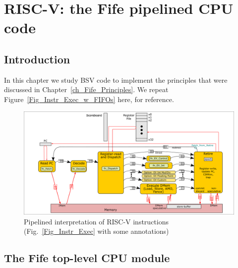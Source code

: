 

\chapter{RISC-V: the Fife pipelined CPU code}


\setcounter{page}{1}
\renewcommand{\thepage}{\arabic{chapter}-\arabic{page}}

\label{ch_Fife_code}


\section{Introduction}

In this chapter we study BSV code to implement the principles that
were discussed in Chapter~\ref{ch_Fife_Principles}.
We repeat Figure~\ref{Fig_Instr_Exec_w_FIFOs} here, for reference.
\begin{figure}[htbp]
  \centerline{\includegraphics[width=6in,angle=0]{Figures/Fig_Instr_Exec_w_FIFOs}}
  \caption{\label{Fig_Instr_Exec_w_FIFOs_2}
                  Pipelined interpretation of RISC-V instructions
		  (Fig.~\ref{Fig_Instr_Exec} with some annotations)}
\end{figure}


\section{The Fife top-level CPU module}

